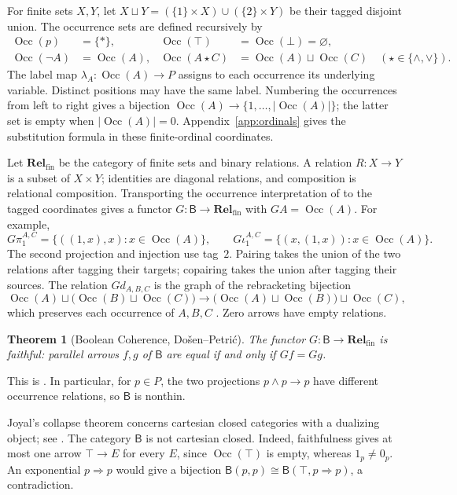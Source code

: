 \documentclass[11pt]{article}
\newtheorem{theorem}{Theorem}[section]
\newcommand{\B}{\mathsf B}
\newcommand{\Occ}{\operatorname{Occ}}
\newcommand{\Rel}{\mathbf{Rel}_{\mathrm{fin}}}
\begin{document}
For finite sets $X,Y$, let
$X\sqcup Y=(\{1\}\times X)\cup(\{2\}\times Y)$ be their tagged
disjoint union. The occurrence sets are defined recursively by
\[
 \begin{aligned}
 \Occ(p)&=\{*\},&
 \Occ(\top)&=\Occ(\bot)=\varnothing,\\
 \Occ(\neg A)&=\Occ(A),&
 \Occ(A\mathbin\star C)&=\Occ(A)\sqcup\Occ(C)
       \quad(\star\in\{\wedge,\vee\}).
 \end{aligned}
\]
The label map $\lambda_A:\Occ(A)\to P$ assigns to each occurrence
its underlying variable. Distinct positions may have the same label.
Numbering the occurrences from left to right gives a bijection
$\Occ(A)\to\{1,\ldots,|\Occ(A)|\}$; the latter set is empty when
$|\Occ(A)|=0$. Appendix~\ref{app:ordinals} gives the substitution
formula in these finite-ordinal coordinates.

Let $\Rel$ be the category of finite sets and binary relations.
A relation $R:X\to Y$ is a subset of $X\times Y$; identities are
diagonal relations, and composition is relational composition.
Transporting the occurrence interpretation of \cite{DP} to the
tagged coordinates gives a functor
$G:\B\to\Rel$ with $GA=\Occ(A)$.
For example,
\[
 G\pi_1^{A,C}=\{((1,x),x):x\in\Occ(A)\},\qquad
 G\iota_1^{A,C}=\{(x,(1,x)):x\in\Occ(A)\}.
\]
The second projection and injection use tag~$2$. Pairing takes the
union of the two relations after tagging their targets; copairing
takes the union after tagging their sources. The relation $Gd_{A,B,C}$
is the graph of the rebracketing bijection
\[
 \Occ(A)\sqcup\bigl(\Occ(B)\sqcup\Occ(C)\bigr)
 \longrightarrow
 \bigl(\Occ(A)\sqcup\Occ(B)\bigr)\sqcup\Occ(C),
\]
which preserves each occurrence of $A,B,C$
\cite[\S2.9, p.~60]{DP}. Zero arrows have empty relations.

\begin{theorem}[Boolean Coherence, Do\v{s}en--Petri\'c]
\label{thm:coherence}
The functor $G:\B\to\Rel$ is faithful: parallel arrows $f,g$ of
$\B$ are equal if and only if $Gf=Gg$.
\end{theorem}

This is \cite[\S14.2, p.~321]{DP}. In particular, for $p\in P$, the
two projections $p\wedge p\to p$ have different occurrence
relations, so $\B$ is nonthin.

Joyal's collapse theorem concerns cartesian closed categories with a
dualizing object; see \cite[\S14.3, pp.~324--326]{DP}. The category
$\B$ is not cartesian closed. Indeed, faithfulness gives at most one
arrow $\top\to E$ for every $E$, since $\Occ(\top)$ is empty,
whereas $1_p\ne0_p$. An exponential $p\Rightarrow p$ would give
a bijection $\B(p,p)\cong\B(\top,p\Rightarrow p)$, a contradiction.
\end{document}
